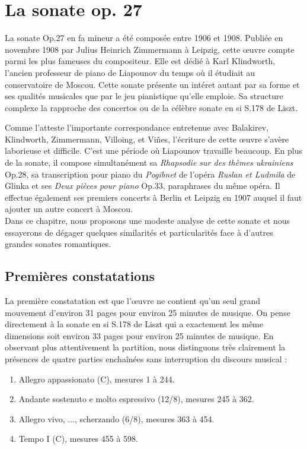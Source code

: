 
\chapter{La sonate op. 27}

La sonate Op.27 en fa mineur a été composée entre 1906 et 1908. Publiée en novembre 1908 par Julius Heinrich Zimmermann à Leipzig, cette œuvre compte parmi les plus fameuses du compositeur. Elle est dédié à Karl Klindworth, l'ancien professeur de piano de Liapounov du temps où il étudiait au conservatoire de Moscou. Cette sonate présente un intéret autant par sa forme et ses qualités musicales que par le jeu pianistique qu'elle emploie. Sa structure complexe la rapproche des concertos ou de la célèbre sonate en si S.178 de Liszt.

Comme l'atteste l'importante correspondance entretenue avec Balakirev, Klindworth, Zimmermann, Villoing, et Viñes, l'écriture de cette œuvre s'avère laborieuse et difficile. C'est une période où Liapounov travaille beaucoup. En plus de la sonate, il compose simultanément sa \emph{Rhapsodie sur des thèmes ukrainiens} Op.28, sa transcription pour piano du \emph{Pogibnet} de l'opéra \emph{Ruslan et Ludmila} de Glinka et ses \emph{Deux pièces pour piano} Op.33, paraphrases du même opéra. Il effectue également ses premiers concerts à Berlin et Leipzig en 1907 auquel il faut ajouter un autre concert à Moscou.\\

Dans ce chapitre, nous proposons une modeste analyse de cette sonate et nous essayerons de dégager quelques similarités et particularités face à d'autres grandes sonates romantiques.

\section{Premières constatations}

La première constatation est que l'œuvre ne contient qu'un seul grand mouvement d'environ 31 pages pour environ 25 minutes de musique. On pense directement à la sonate en si S.178 de Liszt qui a exactement les même dimensions soit environ 33 pages pour environ 25 minutes de musique. En observant plus attentivement la partition, nous distinguons très clairement la présences de quatre parties enchaînées sans interruption du discours musical :
\begin{enumerate}
  \item Allegro appassionato (C), mesures 1 à 244.
  \item Andante sostenuto e molto espressivo (12/8), mesures 245 à 362.
  \item Allegro vivo, ..., scherzando (6/8), mesures 363 à 454.
  \item Tempo I (C), mesures 455 à 598.\\
\end{enumerate}

